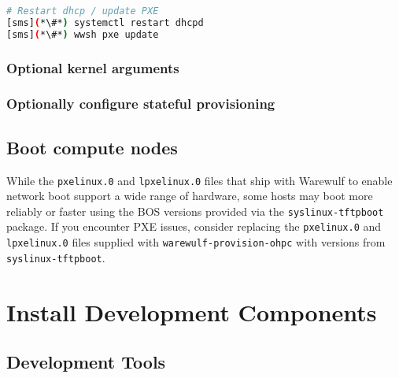 \documentclass[letterpaper]{article}
\begin{document}


\begin{lstlisting}[language=bash,keywords={},upquote=true,basicstyle=\footnotesize\ttfamily]
# Restart dhcp / update PXE
[sms](*\#*) systemctl restart dhcpd
[sms](*\#*) wwsh pxe update
\end{lstlisting}

\subsubsection{Optional kernel arguments} \label{sec:optional_kargs}


\subsubsection{Optionally configure stateful provisioning}


\vspace*{-0.1cm}
\subsection{Boot compute nodes} \label{sec:boot_computes}
 


\begin{center}
\begin{tcolorbox}[]
\small While the \texttt{pxelinux.0} and \texttt{lpxelinux.0} files that ship
with Warewulf to enable network boot support a wide range of hardware, some
hosts may boot more reliably or faster using the BOS versions provided via the
\texttt{syslinux-tftpboot} package. If you encounter PXE issues, consider
replacing the \texttt{pxelinux.0} and \texttt{lpxelinux.0} files supplied with
\texttt{warewulf-provision-ohpc} with versions from \texttt{syslinux-tftpboot}.
\end{tcolorbox}
\end{center}

\vspace*{-0.50cm}
\section{Install \OHPC{} Development Components}


\vspace*{-0.15cm}
\subsection{Development Tools} \label{sec:install_dev_tools}

\end{document}
